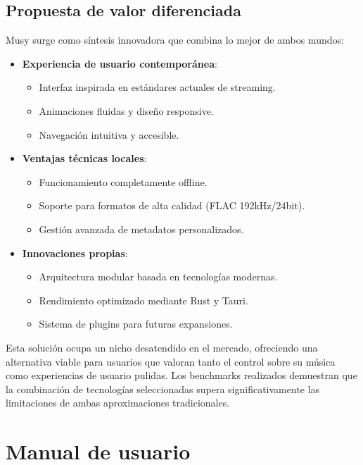 \documentclass[11pt, a4paper]{article}
\begin{document}
  \subsection{Propuesta de valor diferenciada}

  Musy surge como síntesis innovadora que combina lo mejor de ambos mundos:

  \begin{itemize}
      \item \textbf{Experiencia de usuario contemporánea}:
      \begin{itemize}
          \item Interfaz inspirada en estándares actuales de streaming.
          \item Animaciones fluidas y diseño responsive.
          \item Navegación intuitiva y accesible.
      \end{itemize}
      
      \item \textbf{Ventajas técnicas locales}:
      \begin{itemize}
          \item Funcionamiento completamente offline.
          \item Soporte para formatos de alta calidad (FLAC 192kHz/24bit).
          \item Gestión avanzada de metadatos personalizados.
      \end{itemize}
      
      \item \textbf{Innovaciones propias}:
      \begin{itemize}
          \item Arquitectura modular basada en tecnologías modernas.
          \item Rendimiento optimizado mediante Rust y Tauri.
          \item Sistema de plugins para futuras expansiones.
      \end{itemize}
  \end{itemize}

  Esta solución ocupa un nicho desatendido en el mercado, ofreciendo una alternativa viable para usuarios que valoran tanto el control sobre su música como experiencias de usuario pulidas. Los benchmarks realizados demuestran que la combinación de tecnologías seleccionadas supera significativamente las limitaciones de ambas aproximaciones tradicionales.

\section{Manual de usuario}
\end{document}
